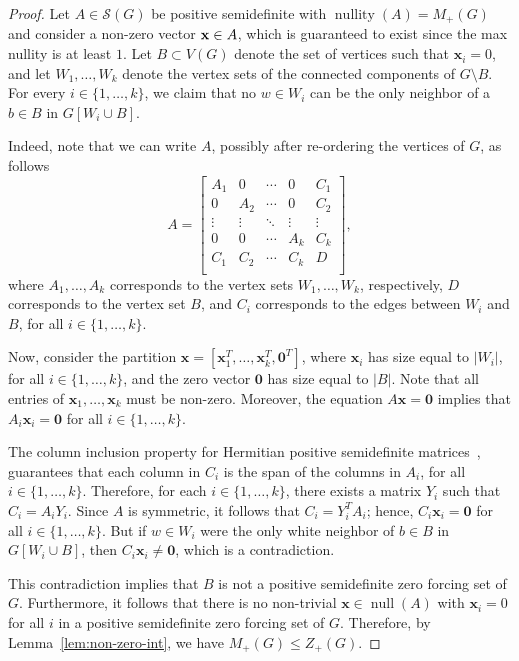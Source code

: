 \documentclass{article}
\theoremstyle{definition}
\newcommand\abs[1]{\left|#1\right|}
\newcommand\nullity[1]{\operatorname{nullity}\left(#1\right)}
\newcommand\kernel[1]{\operatorname{null}\left(#1\right)}
\begin{document}
\begin{proof}
Let $A\in\mathcal{S}(G)$ be positive semidefinite with $\nullity{A}=M_{+}(G)$ and consider a non-zero vector $\textbf{x}\in\null{A}$, which is guaranteed to exist since the max nullity is at least $1$.
Let $B\subset V(G)$ denote the set of vertices such that $\textbf{x}_{i}=0$, and let $W_{1},\ldots,W_{k}$ denote the vertex sets of the connected components of $G\setminus{B}$.
For every $i\in\{1,\ldots,k\}$, we claim that no $w\in W_{i}$ can be the only neighbor of a $b\in B$ in $G[W_{i}\cup B]$.

Indeed, note that we can write $A$, possibly after re-ordering the vertices of $G$, as follows 
\[
A = \begin{bmatrix}
		A_{1} & 0 & \cdots & 0 & C_{1} \\
		0 & A_{2} & \cdots & 0 & C_{2} \\
		\vdots & \vdots & \ddots & \vdots & \vdots \\
		0 & 0 & \cdots & A_{k} & C_{k} \\
		C_{1} & C_{2} & \cdots & C_{k} & D \\
		\end{bmatrix},
\]
where $A_{1},\ldots,A_{k}$ corresponds to the vertex sets $W_{1},\ldots,W_{k}$, respectively, $D$ corresponds to the vertex set $B$, and $C_{i}$ corresponds to the edges between $W_{i}$ and $B$, for all $i\in\{1,\ldots,k\}$.

Now, consider the partition $\textbf{x} = [\textbf{x}_{1}^{T},\ldots,\textbf{x}_{k}^{T},\textbf{0}^{T}]$, where $\textbf{x}_{i}$ has size equal to $\abs{W_{i}}$, for all $i\in\{1,\ldots,k\}$, and the zero vector $\textbf{0}$ has size equal to $\abs{B}$.
Note that all entries of $\textbf{x}_{1},\ldots,\textbf{x}_{k}$ must be non-zero.
Moreover, the equation $A\textbf{x}=\textbf{0}$ implies that $A_{i}\textbf{x}_{i}=\textbf{0}$ for all $i\in\{1,\ldots,k\}$.

The column inclusion property for Hermitian positive semidefinite matrices~\cite{Johnson1998}, guarantees that each column in $C_{i}$ is the span of the columns in $A_{i}$, for all $i\in\{1,\ldots,k\}$.
Therefore, for each $i\in\{1,\ldots,k\}$, there exists a matrix $Y_{i}$ such that $C_{i}=A_{i}Y_{i}$.
Since $A$ is symmetric, it follows that $C_{i}=Y_{i}^{T}A_{i}$; hence, $C_{i}\textbf{x}_{i}=\textbf{0}$ for all $i\in\{1,\ldots,k\}$.
But if $w\in W_{i}$ were the only white neighbor of $b\in B$ in $G[W_{i}\cup B]$, then $C_{i}\textbf{x}_{i}\neq \textbf{0}$, which is a contradiction. 

This contradiction implies that $B$ is not a positive semidefinite zero forcing set of $G$.
Furthermore, it follows that there is no non-trivial $\textbf{x}\in\kernel{A}$ with $\textbf{x}_{i}=0$ for all $i$ in a positive semidefinite zero forcing set of $G$.
Therefore, by Lemma~\ref{lem:non-zero-int}, we have $M_{+}(G)\leq Z_{+}(G)$.
\end{proof}
\end{document}
